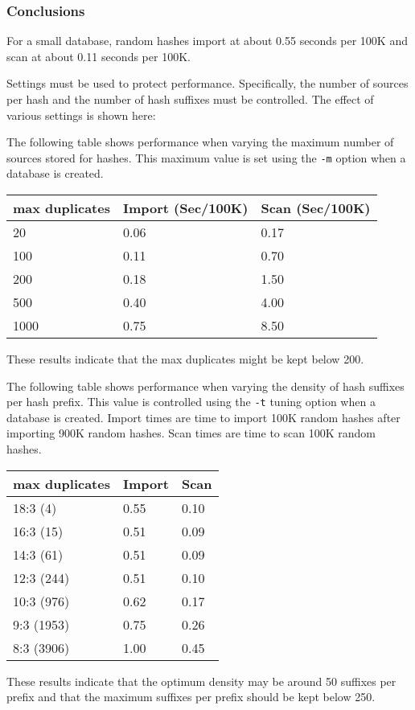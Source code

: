 \documentclass[12pt,twoside]{article}
\begin{document}
\subsubsection*{Conclusions}
\begin{compactitem}
\item For a small database, random hashes import at about 0.55 seconds
per 100K and scan at about 0.11 seconds per 100K.
\item Settings must be used to protect performance.
Specifically, the number of sources per hash and the number of hash suffixes
must be controlled.
The effect of various settings is shown here:

\begin{compactitem}
\item The following table shows performance when varying the maximum number of
sources stored for hashes.
This maximum value is set using the \verb+-m+ option when a database is created.

\vspace{4mm}
\begin{tabular}{|l|l|l|}
\hline
max duplicates & Import (Sec/100K) & Scan (Sec/100K) \\
\hline
20 & 0.06 & 0.17 \\
100 & 0.11 & 0.70 \\
200 & 0.18 & 1.50 \\
500 & 0.40 & 4.00 \\
1000 & 0.75 & 8.50 \\
\hline
\end{tabular}
\vspace{4mm}

These results indicate that the max duplicates might be kept below 200.

\item The following table shows performance when varying the density of
hash suffixes per hash prefix.
This value is controlled using the \verb+-t+ tuning option
when a database is created.
Import times are time to import 100K random hashes
after importing 900K random hashes.
Scan times are time to scan 100K random hashes.

\vspace{4mm}
\begin{tabular}{|l|l|l|}
\hline
max duplicates & Import & Scan \\
\hline
18:3 (4) & 0.55 & 0.10 \\
16:3 (15) & 0.51 & 0.09 \\
14:3 (61) & 0.51 & 0.09 \\
12:3 (244) & 0.51 & 0.10 \\
10:3 (976) & 0.62 & 0.17 \\
9:3 (1953) & 0.75 & 0.26 \\
8:3 (3906) & 1.00 & 0.45 \\
\hline
\end{tabular}
\vspace{4mm}

These results indicate that the optimum density may be around 50
suffixes per prefix and that the maximum suffixes per prefix
should be kept below 250.

\end{compactitem}

\end{compactitem}
\end{document}
